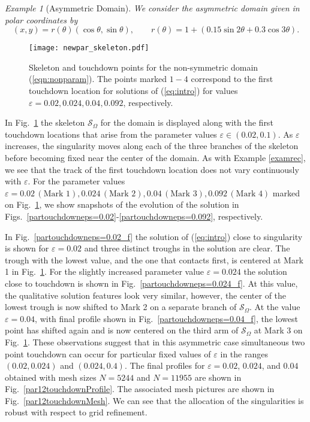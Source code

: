 \documentclass{siamart0516}
\renewcommand{\eqref}[1]{(\ref{#1})}
\newcommand{\eps}{\varepsilon}
\newcommand{\skel}{\mathcal{S}_{\Omega}}
\theoremstyle{plain}%
\theoremstyle{definition}
\theoremstyle{remark}
\newtheorem{exam}{\hspace{1mm}Example}[section]
\begin{document}
\vspace{10pt}

\begin{exam}[Asymmetric Domain]
{\em We consider the asymmetric domain given in polar coordinates by}
\begin{equation}\label{eqn:nonparam}
(x,y) = r(\theta)(\cos\theta,\sin\theta), \qquad r(\theta) =  1 + (0.15\sin 2\theta + 0.3\cos 3\theta).
\end{equation}
\end{exam}

\begin{figure}[htbp]
\centering
\texttt{[image: newpar\_skeleton.pdf]}
\caption{Skeleton and touchdown points for the non-symmetric domain \eqref{eqn:nonparam}. The points marked $1-4$ correspond to the first touchdown location for solutions of \eqref{eq:intro} for values $\eps= 0.02,0.024,0.04,0.092$, respectively. \label{parsk}}
\end{figure}

In Fig.~\ref{parsk} the skeleton $\skel$ for the domain is displayed along with the first touchdown locations that arise from the parameter values $\eps \in (0.02,0.1)$. As $\eps$ increases, the singularity moves along each of the three branches of the skeleton before becoming fixed near the center of the domain. As with Example \ref{examrec}, we see that the track of the first touchdown location does not vary continuously with $\eps$. For the parameter values $\eps = 0.02\, (\text{Mark 1}), 0.024\, (\text{Mark 2}), 0.04\, (\text{Mark 3}), 0.092\, (\text{Mark 4})$ marked on Fig.~\ref{parsk}, we show snapshots of the evolution of the solution in Figs.~\ref{partouchdowneps=0.02}-\ref{partouchdowneps=0.092}, respectively.

In Fig.~\ref{partouchdowneps=0.02_f} the solution of \eqref{eq:intro} close to singularity is shown for $\eps=0.02$ and three distinct troughs in the solution are clear. The trough with the lowest value, and the one that contacts first, is centered at Mark 1 in Fig.~\ref{parsk}. For the slightly increased parameter value $\eps=0.024$ the solution close to touchdown is shown in Fig.~\ref{partouchdowneps=0.024_f}. At this value, the qualitative solution features look very similar, however, the center of the lowest trough is now shifted to Mark 2 on a separate branch of $\skel$. At the value $\eps = 0.04$, with final profile shown in Fig.~\ref{partouchdowneps=0.04_f}, the lowest point has shifted again and is now centered on the third arm of $\skel$ at Mark 3 on Fig.~\ref{parsk}. These observations suggest that in this asymmetric case simultaneous two point touchdown can occur for particular fixed values of $\eps$ in the ranges $(0.02,0.024)$ and $(0.024,0.4)$. The final profiles for $\eps = 0.02$, $0.024$, and $0.04$ obtained with mesh sizes $N = 5244$ and $N = 11955$ are shown in Fig.~\ref{par12touchdownProfile}. The associated mesh pictures are shown in Fig.~\ref{par12touchdownMesh}. We can see that the allocation of the singularities is robust with respect to grid refinement.
\end{document}
